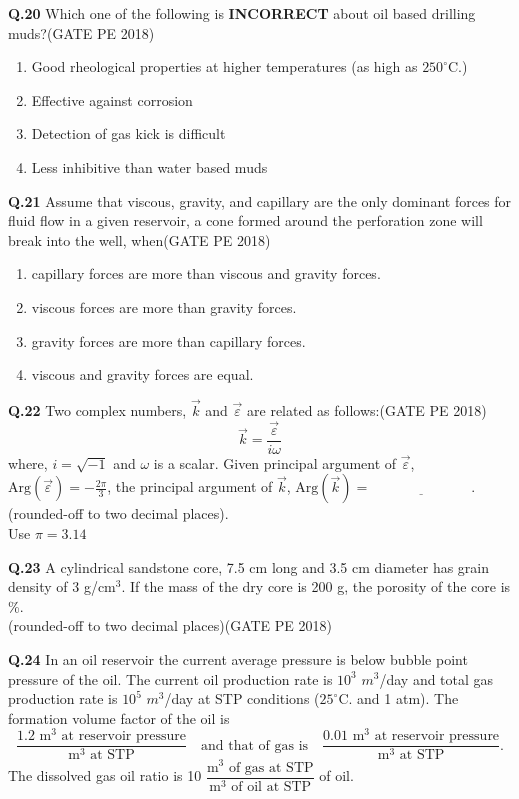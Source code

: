 \documentclass[15pt,a4paper]{article}
\begin{document}
\noindent
\textbf{Q.20}  Which one of the following is \textbf{INCORRECT} about oil based drilling muds?\hfill(GATE PE 2018)
\begin{enumerate}
\item Good rheological properties at higher temperatures (as high as $250^\circ\text{C}$.)
\item Effective against corrosion
\item Detection of gas kick is difficult
\item Less inhibitive than water based muds
\end{enumerate}

\noindent
\textbf{Q.21} Assume that viscous, gravity, and capillary are the only dominant forces for fluid flow in a
given reservoir, a cone formed around the perforation zone will break into the well, when\hfill(GATE PE 2018)
\begin{enumerate}
\item capillary forces are more than viscous and gravity forces.
\item viscous forces are more than gravity forces.
\item gravity forces are more than capillary forces.
\item viscous and gravity forces are equal.
\end{enumerate}

\noindent\textbf{Q.22} Two complex numbers, $\vec{k}$ and $\vec{\varepsilon}$ are related as follows:\hfill(GATE PE 2018)
\[
\vec{k} = \frac{\vec{\varepsilon}}{i\omega}
\]
where, $i = \sqrt{-1}$ and $\omega$ is a scalar. Given principal argument of $\vec{\varepsilon}$, $\text{Arg}(\vec{\varepsilon}) = -\frac{2\pi}{3}$, the principal argument of $\vec{k}$, $\text{Arg}(\vec{k}) = \underline{\hspace{3cm}}$. (rounded-off to two decimal places). \\
Use $\pi = 3.14$

\vspace{1cm}

\noindent\textbf{Q.23} A cylindrical sandstone core, 7.5 cm long and 3.5 cm diameter has grain density of 3 g/cm$^3$. If the mass of the dry core is 200 g, the porosity of the core is \underline{\hspace{3cm}} \%.\\
(rounded-off to two decimal places)\hfill(GATE PE 2018)

\vspace{1cm}

\noindent\textbf{Q.24} In an oil reservoir the current average pressure is below bubble point pressure of the oil. The current oil production rate is $10^3$ $m^3$/day and total gas production rate is $10^5$ $m^3$/day at STP conditions ($25^\circ\text{C}$. and 1 atm). The formation volume factor of the oil is
\[
\frac{1.2 \text{ m}^3 \text{ at reservoir pressure}}{\text{m}^3 \text{ at STP}} \quad \text{and that of gas is} \quad \frac{0.01 \text{ m}^3 \text{ at reservoir pressure}}{\text{m}^3 \text{ at STP}}.
\]
The dissolved gas oil ratio is 10 $\dfrac{\text{m}^3 \text{ of gas at STP}}{\text{m}^3 \text{ of oil at STP}}$ of oil.
\end{document}

